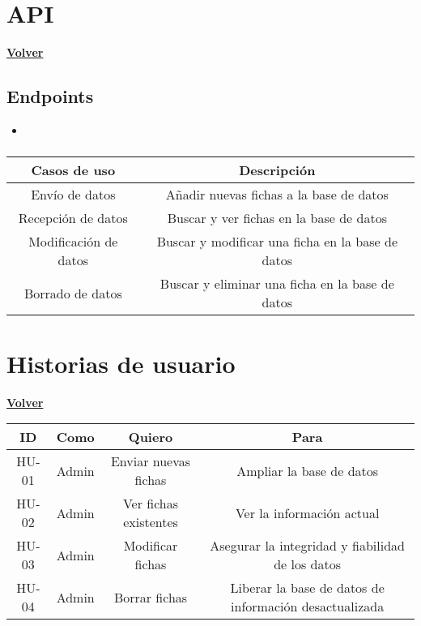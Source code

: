 \documentclass[a4paper,12pt]{article}
\begin{document}
\clearpage

\section{API}
\hyperlink{anchor-indice}{\textbf{Volver}}\\

\subsection{Endpoints}
\begin{itemize}
    \item 
\end{itemize}

\subsubsection{}

\begin{tabular}{ |c|c| } 
 \hline
 \textbf{Casos de uso} & \textbf{Descripción} \\ 
 \hline
 Envío de datos & Añadir nuevas fichas a la base de datos\\ 
 \hline
 Recepción de datos & Buscar y ver fichas en la base de datos\\
 \hline
 Modificación de datos & Buscar y modificar una ficha en la base de datos\\
 \hline
 Borrado de datos & Buscar y eliminar una ficha en la base de datos\\
 \hline
\end{tabular}


\section{Historias de usuario}
\hyperlink{anchor-indice}{\textbf{Volver}}\\

\begin{tabular}{ |c|c|c|c| } 
 \hline
 \textbf{ID} & \textbf{Como} & \textbf{Quiero} & \textbf{Para} \\ 
 \hline
 HU-01 & Admin & Enviar nuevas fichas & Ampliar la base de datos\\ 
 \hline
 HU-02 & Admin & Ver fichas existentes & Ver la información actual\\
 \hline
 HU-03 & Admin & Modificar fichas & Asegurar la integridad y fiabilidad de los datos\\
 \hline
 HU-04 & Admin & Borrar fichas & Liberar la base de datos de información desactualizada\\
 \hline
\end{tabular}
\end{document}
